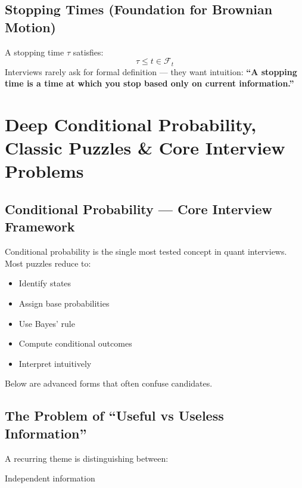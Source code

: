 \documentclass{report}
\begin{document}
\subsection*{Stopping Times (Foundation for Brownian Motion)}
A stopping time $\tau$ satisfies:
\begin{equation*}
    {\tau\le t}\in \mathcal{F}_t
\end{equation*}
Interviews rarely ask for formal definition —
they want intuition:
\textbf{“A stopping time is a time at which you stop based only on current information.”}



\section{Deep Conditional Probability, Classic Puzzles \& Core Interview Problems}

\subsection*{Conditional Probability — Core Interview Framework}
Conditional probability is the single most tested concept in quant interviews.
Most puzzles reduce to:
\begin{itemize}
    \item Identify states
    \item Assign base probabilities
    \item Use Bayes’ rule
    \item Compute conditional outcomes
    \item Interpret intuitively
\end{itemize}
Below are advanced forms that often confuse candidates.

\subsection*{The Problem of “Useful vs Useless Information”}
A recurring theme is distinguishing between:

Independent information
\end{document}
